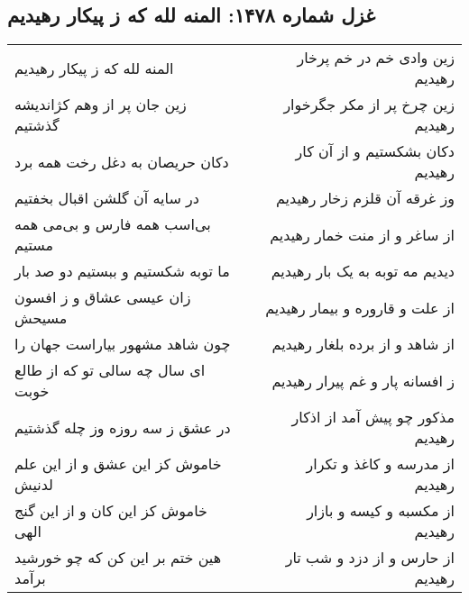 \begin{center}
\section*{غزل شماره ۱۴۷۸: المنه لله که ز پیکار رهیدیم}
\label{sec:1478}
\begin{longtable}{l p{0.5cm} r}
المنه لله که ز پیکار رهیدیم
&&
زین وادی خم در خم پرخار رهیدیم
\\
زین جان پر از وهم کژاندیشه گذشتیم
&&
زین چرخ پر از مکر جگرخوار رهیدیم
\\
دکان حریصان به دغل رخت همه برد
&&
دکان بشکستیم و از آن کار رهیدیم
\\
در سایه آن گلشن اقبال بخفتیم
&&
وز غرقه آن قلزم زخار رهیدیم
\\
بی‌اسب همه فارس و بی‌می همه مستیم
&&
از ساغر و از منت خمار رهیدیم
\\
ما توبه شکستیم و ببستیم دو صد بار
&&
دیدیم مه توبه به یک بار رهیدیم
\\
زان عیسی عشاق و ز افسون مسیحش
&&
از علت و قاروره و بیمار رهیدیم
\\
چون شاهد مشهور بیاراست جهان را
&&
از شاهد و از برده بلغار رهیدیم
\\
ای سال چه سالی تو که از طالع خوبت
&&
ز افسانه پار و غم پیرار رهیدیم
\\
در عشق ز سه روزه وز چله گذشتیم
&&
مذکور چو پیش آمد از اذکار رهیدیم
\\
خاموش کز این عشق و از این علم لدنیش
&&
از مدرسه و کاغذ و تکرار رهیدیم
\\
خاموش کز این کان و از این گنج الهی
&&
از مکسبه و کیسه و بازار رهیدیم
\\
هین ختم بر این کن که چو خورشید برآمد
&&
از حارس و از دزد و شب تار رهیدیم
\\
\end{longtable}
\end{center}

